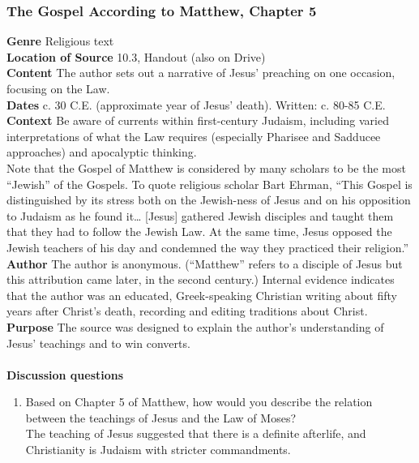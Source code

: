 \documentclass{article}
\begin{document}
\subsubsection*{The Gospel According to Matthew, Chapter 5}
\textbf{Genre}
Religious text \\
\textbf{Location of Source}
10.3, Handout (also on Drive) \\
\textbf{Content}
The author sets out a narrative of Jesus’ preaching on one occasion, focusing on the Law. \\
\textbf{Dates}
c. 30 C.E. (approximate year of Jesus’ death). Written: c. 80-85 C.E. \\
\textbf{Context}
Be aware of currents within first-century Judaism, including varied interpretations of what
the Law requires (especially Pharisee and Sadducee approaches) and apocalyptic thinking. \\
Note that the Gospel of Matthew is considered by many scholars to be the most “Jewish”
of the Gospels. To quote religious scholar Bart Ehrman, “This Gospel is distinguished by its
stress both on the Jewish-ness of Jesus and on his opposition to Judaism as he found it…
[Jesus] gathered Jewish disciples and taught them that they had to follow the Jewish Law.
At the same time, Jesus opposed the Jewish teachers of his day and condemned the way
they practiced their religion.” \\
\textbf{Author}
The author is anonymous. (“Matthew” refers to a disciple of Jesus but this attribution came
later, in the second century.) Internal evidence indicates that the author was an educated,
Greek-speaking Christian writing about fifty years after Christ’s death, recording and editing
traditions about Christ. \\
\textbf{Purpose}
The source was designed to explain the author’s understanding of Jesus’ teachings and to
win converts. \\
\\
\textbf{Discussion questions}
\begin{enumerate}
  \item Based on Chapter 5 of Matthew, how would you describe the relation between the
  teachings of Jesus and the Law of Moses? \\
  The teaching of Jesus suggested that there is a definite afterlife, and Christianity is
  Judaism with stricter commandments.
\end{enumerate}
\end{document}
